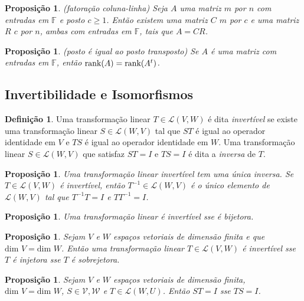 \documentclass[12pt]{article}
\theoremstyle{plain}
\newtheorem{prop}[thm]{Proposição}
\theoremstyle{definition}
\newtheorem{defn}{Definição}[section]
\theoremstyle{remark}
\begin{document}
\begin{prop} (fatoração coluna-linha)
    Seja \(A\) uma matriz \(m\) por \(n\) com entradas em \(\mathbb{F}\) e posto \(c \geq 1\). Então existem uma matriz \(C\) \(m\) por \(c\) e uma matriz \(R\) \(c\) por \(n\), ambas com entradas em \(\mathbb{F}\), tais que \(A = CR\).
\end{prop}

\begin{prop} (posto é igual ao posto transposto)
    Se \(A\) é uma matriz com entradas em \(\mathbb{F}\), então \(\textup{rank}(A) = \textup{rank}(A^t)\).
\end{prop}

\subsection{Invertibilidade e Isomorfismos}
\begin{defn}
    Uma transformação linear \(T \in \mathcal{L}(V, W)\) é dita \emph{invertível} se existe uma transformação linear \(S \in \mathcal{L}(W, V)\) tal que \(ST\) é igual ao operador identidade em \(V\) e \(TS\) é igual ao operador identidade em \(W\). Uma transformação linear \(S \in \mathcal{L}(W, V)\) que satisfaz \(ST = I\) e \(TS = I\) é dita a \emph{inversa} de \(T\).
\end{defn}

\begin{prop}
    Uma transformação linear invertível tem uma única inversa. Se \(T \in \mathcal{L}(V, W)\) é invertível, então \(T^{-1} \in \mathcal{L}(W, V)\) é o único elemento de \(\mathcal{L}(W, V)\) tal que \(T^{-1}T = I\) e \(TT^{-1} = I\).
\end{prop}

\begin{prop}
    Uma transformação linear é invertível sse é bijetora.
\end{prop}

\begin{prop}
    Sejam \(V\) e \(W\) espaços vetoriais de dimensão finita e que \(\text{dim } V = \text{dim } W\). Então uma transformação linear \(T \in \mathcal{L}(V, W)\) é invertível sse \(T\) é injetora sse \(T\) é sobrejetora.
\end{prop}

\begin{prop}
    Sejam \(V\) e \(W\) espaços vetoriais de dimensão finita, \(\text{dim } V = \text{dim } W\), \(S \in \mathcal{V, W}\) e \(T \in \mathcal{L}(W, U)\). Então \(ST = I\) sse \(TS = I\).
\end{prop}
\end{document}
